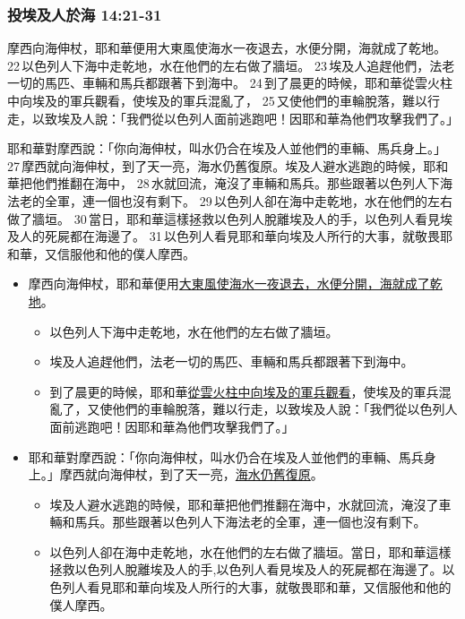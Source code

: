 \subsubsection{投埃及人於海 14:21-31}
摩西向海伸杖，耶和華便用大東風使海水一夜退去，水便分開，海就成了乾地。 22 以色列人下海中走乾地，水在他們的左右做了牆垣。 23 埃及人追趕他們，法老一切的馬匹、車輛和馬兵都跟著下到海中。 24 到了晨更的時候，耶和華從雲火柱中向埃及的軍兵觀看，使埃及的軍兵混亂了， 25 又使他們的車輪脫落，難以行走，以致埃及人說：「我們從以色列人面前逃跑吧！因耶和華為他們攻擊我們了。」

耶和華對摩西說：「你向海伸杖，叫水仍合在埃及人並他們的車輛、馬兵身上。」 27 摩西就向海伸杖，到了天一亮，海水仍舊復原。埃及人避水逃跑的時候，耶和華把他們推翻在海中， 28 水就回流，淹沒了車輛和馬兵。那些跟著以色列人下海法老的全軍，連一個也沒有剩下。 29 以色列人卻在海中走乾地，水在他們的左右做了牆垣。 30 當日，耶和華這樣拯救以色列人脫離埃及人的手，以色列人看見埃及人的死屍都在海邊了。 31 以色列人看見耶和華向埃及人所行的大事，就敬畏耶和華，又信服他和他的僕人摩西。

\begin{itemize} 
\itemsep-.35em 
\item 摩西向海伸杖，耶和華便用\underline{大東風使海水一夜退去，水便分開，海就成了乾地}。
\begin{itemize} 
\itemsep-.35em 
\item 以色列人下海中走乾地，水在他們的左右做了牆垣。 
\item 埃及人追趕他們，法老一切的馬匹、車輛和馬兵都跟著下到海中。
\item 到了晨更的時候，耶和華\underline{從雲火柱中向埃及的軍兵觀看}，使埃及的軍兵混亂了，又使他們的車輪脫落，難以行走，以致埃及人說：「我們從以色列人面前逃跑吧！因耶和華為他們攻擊我們了。」
\end{itemize}
\item 耶和華對摩西說：「你向海伸杖，叫水仍合在埃及人並他們的車輛、馬兵身上。」摩西就向海伸杖，到了天一亮，\underline{海水仍舊復原}。 
\begin{itemize} 
\itemsep-.35em 
\item 埃及人避水逃跑的時候，耶和華把他們推翻在海中，水就回流，淹沒了車輛和馬兵。那些跟著以色列人下海法老的全軍，連一個也沒有剩下。
\item 以色列人卻在海中走乾地，水在他們的左右做了牆垣。當日，耶和華這樣拯救以色列人脫離埃及人的手,以色列人看見埃及人的死屍都在海邊了。以色列人看見耶和華向埃及人所行的大事，就敬畏耶和華，又信服他和他的僕人摩西。
\end{itemize}
\end{itemize}

